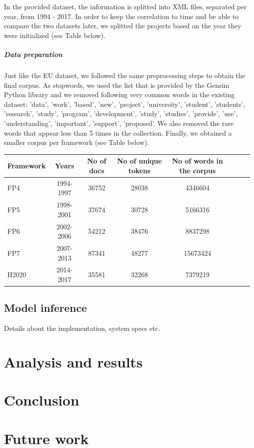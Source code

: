 \documentclass[12pt]{report}
\begin{document}
In the provided dataset, the information is splitted into XML files, separated per year, from 1994 - 2017. In order to keep the correlation to time and be able to compare the two datasets later, we splitted the projects based on the year they were initialized (see Table below).

\subparagraph{Data preparation}

Just like the EU dataset, we followed the same preprocessing steps to obtain the final corpus. As stopwords, we used the list that is provided by the Gensim Python library and we removed following very common words in the existing dataset: 'data', 'work', 'based', 'new', 'project', 'university', 'student', 'students', 'research', 'study', 'program', 'development', 'study', 'studies', 'provide', 'use', 'understanding', 'important', 'support', 'proposed'. We also removed the rare words that appear less than 5 times in the collection. Finally, we obtained a smaller corpus per framework (see Table below).

\begin{center}
\begin{tabular}{l*{6}{c}r}
Framework         & Years & No of docs & No of unique tokens & No of words in the corpus \\
\hline
FP4 & 1994-1997 & 36752 & 28038 & 4346604 \\
FP5 & 1998-2001 & 37674 & 30728 & 5166316 \\
FP6 & 2002-2006 & 54212 & 38476 & 8837298 \\
FP7 & 2007-2013 & 87341 & 48277 & 15673424 \\
H2020 & 2014-2017 & 35581 & 32268 & 7379219 \\
\end{tabular}
\end{center}

\subsection{Model inference}

Details about the implementation, system specs etc.


\section{Analysis and results}


\section{Conclusion}

\section{Future work}

{}

\end{document}
